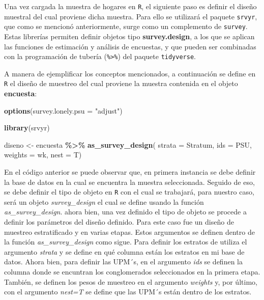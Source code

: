 \documentclass[
  spanish,
  12pt,
]{book}
\newenvironment{Shaded}{\begin{snugshade}}{\end{snugshade}}
\newcommand{\AttributeTok}[1]{\textcolor[rgb]{0.13,0.29,0.53}{#1}}
\newcommand{\FunctionTok}[1]{\textcolor[rgb]{0.13,0.29,0.53}{\textbf{#1}}}
\newcommand{\NormalTok}[1]{#1}
\newcommand{\OtherTok}[1]{\textcolor[rgb]{0.56,0.35,0.01}{#1}}
\newcommand{\SpecialCharTok}[1]{\textcolor[rgb]{0.81,0.36,0.00}{\textbf{#1}}}
\newcommand{\StringTok}[1]{\textcolor[rgb]{0.31,0.60,0.02}{#1}}
\begin{document}
Una vez cargada la muestra de hogares en \texttt{R}, el siguiente paso es definir el diseño muestral del cual proviene dicha muestra. Para ello se utilizará el paquete \texttt{srvyr}, que como se mencionó anteriormente, surge como un complemento de \texttt{survey}. Estas librerías permiten definir objetos tipo \textbf{survey.design}, a los que se aplican las funciones de estimación y análisis de encuestas, y que pueden ser combinadas con la programación de tubería (\texttt{\%\textgreater{}\%}) del paquete \texttt{tidyverse}.

A manera de ejemplificar los conceptos mencionados, a continuación se define en \texttt{R} el diseño de muestreo del cual proviene la muestra contenida en el objeto \textbf{encuesta}:

\begin{Shaded}
\begin{Highlighting}[]
\FunctionTok{options}\NormalTok{(}\AttributeTok{survey.lonely.psu =} \StringTok{"adjust"}\NormalTok{) }

\FunctionTok{library}\NormalTok{(srvyr)}

\NormalTok{diseno }\OtherTok{\textless{}{-}}\NormalTok{ encuesta }\SpecialCharTok{\%\textgreater{}\%} 
  \FunctionTok{as\_survey\_design}\NormalTok{(}
    \AttributeTok{strata =}\NormalTok{ Stratum,  }
    \AttributeTok{ids =}\NormalTok{ PSU,        }
    \AttributeTok{weights =}\NormalTok{ wk,      }
    \AttributeTok{nest =}\NormalTok{ T)}
\end{Highlighting}
\end{Shaded}

En el código anterior se puede observar que, en primera instancia se debe definir la base de datos en la cual se encuentra la muestra seleccionada. Seguido de eso, se debe definir el tipo de objeto en \texttt{R} con el cual se trabajará, para nuestro caso, será un objeto \emph{survey\_design} el cual se define usando la función \emph{as\_survey\_design}. ahora bien, una vez definido el tipo de objeto se procede a definir los parámetros del diseño definido. Para este caso fue un diseño de muestreo estratificado y en varias etapas. Estos argumentos se definen dentro de la función \emph{as\_survey\_design} como sigue. Para definir los estratos de utiliza el argumento \emph{strata} y se define en qué columna están los estratos en mi base de datos. Ahora bien, para definir las UPM´s, en el argumento \emph{ids} se definen la columna donde se encuntran los conglomerados seleccionados en la primera etapa. También, se definen los pesos de muestreo en el argumento \emph{weights} y, por último, con el argumento \emph{nest=T} se define que las UPM´s están dentro de los estratos.
\end{document}
